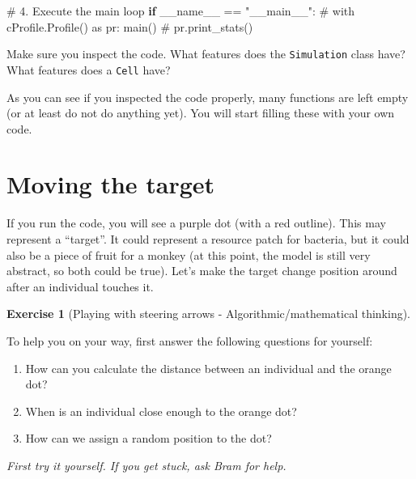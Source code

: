 \documentclass[
  letterpaper,
  DIV=11,
  numbers=noendperiod]{scrreprt}
\newenvironment{Shaded}{\begin{snugshade}}{\end{snugshade}}
\newcommand{\CommentTok}[1]{\textcolor[rgb]{0.37,0.37,0.37}{#1}}
\newcommand{\ControlFlowTok}[1]{\textcolor[rgb]{0.00,0.23,0.31}{\textbf{#1}}}
\newcommand{\NormalTok}[1]{\textcolor[rgb]{0.00,0.23,0.31}{#1}}
\newcommand{\OperatorTok}[1]{\textcolor[rgb]{0.37,0.37,0.37}{#1}}
\newcommand{\StringTok}[1]{\textcolor[rgb]{0.13,0.47,0.30}{#1}}
\newcommand{\VariableTok}[1]{\textcolor[rgb]{0.07,0.07,0.07}{#1}}
\providecommand{\tightlist}{%
  \setlength{\itemsep}{0pt}\setlength{\parskip}{0pt}}\usepackage{longtable,booktabs,array}
\theoremstyle{definition}
\newtheorem{exercise}{Exercise}[chapter]
\theoremstyle{remark}
\begin{document}
\begin{tcolorbox}
\begin{Shaded}
\begin{Highlighting}[]
            
\CommentTok{\# 4. Execute the main loop}
\ControlFlowTok{if} \VariableTok{\_\_name\_\_} \OperatorTok{==} \StringTok{"\_\_main\_\_"}\NormalTok{:}
    \CommentTok{\# with cProfile.Profile() as pr:}
\NormalTok{        main()}
        \CommentTok{\# pr.print\_stats()}


\end{Highlighting}
\end{Shaded}

\end{tcolorbox}

Make sure you inspect the code. What features does the
\texttt{Simulation} class have? What features does a \texttt{Cell} have?

As you can see if you inspected the code properly, many functions are
left empty (or at least do not do anything yet). You will start filling
these with your own code.

\section{Moving the target}\label{sec-movingtarget}

If you run the code, you will see a purple dot (with a red outline).
This may represent a ``target''. It could represent a resource patch for
bacteria, but it could also be a piece of fruit for a monkey (at this
point, the model is still very abstract, so both could be true). Let's
make the target change position around after an individual touches it.

\begin{exercise}[Playing with steering arrows - Algorithmic/mathematical
thinking]\protect\hypertarget{exr-steering}{}\label{exr-steering}

To help you on your way, first answer the following questions for
yourself:

\begin{enumerate}
\def\labelenumi{\alph{enumi}.}
\tightlist
\item
  How can you calculate the distance between an individual and the
  orange dot?
\item
  When is an individual close enough to the orange dot?
\item
  How can we assign a random position to the dot?
\end{enumerate}

\end{exercise}

\emph{First try it yourself. If you get stuck, ask Bram for help.}
\end{document}
